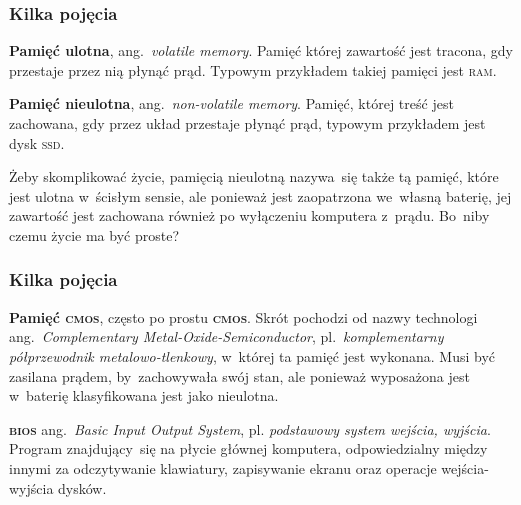 \documentclass[10pt,t]{beamer}
\begin{document}
\begin{frame}
  \frametitle{Kilka pojęcia}


  \textbf{Pamięć ulotna}, ang.~\textit{volatile memory}. Pamięć której
  zawartość jest tracona, gdy przestaje przez nią płynąć prąd. Typowym
  przykładem takiej pamięci jest \textsc{ram}.

  \textbf{Pamięć nieulotna}, ang.~\textit{non-volatile memory}. Pamięć,
  której treść jest zachowana, gdy przez układ przestaje płynąć prąd,
  typowym przykładem jest dysk \textsc{ssd}.

  Żeby skomplikować życie, pamięcią nieulotną nazywa~się także tą pamięć,
  które jest ulotna w~ścisłym sensie, ale ponieważ jest zaopatrzona
  we~własną baterię, jej zawartość jest zachowana również po wyłączeniu
  komputera z~prądu. Bo~niby czemu życie ma być proste?

\end{frame}





\begin{frame}
  \frametitle{Kilka pojęcia}


  \textbf{Pamięć \textsc{cmos}}, często po prostu \textbf{\textsc{cmos}}.
  Skrót pochodzi od nazwy technologi ang.~\textit{Complementary
    Metal-Oxide-Semiconductor}, pl.~\textit{komplementarny półprzewodnik
    metalowo-tlenkowy}, w~której ta pamięć jest wykonana. Musi być zasilana
  prądem, by~zachowywała swój stan, ale ponieważ wyposażona jest w~baterię
  klasyfikowana jest jako nieulotna.

  \textbf{\textsc{bios}} ang.~\textit{Basic Input Output System}, pl.
  \textit{podstawowy system wejścia, wyjścia}. Program znajdujący~się
  na płycie głównej komputera, odpowiedzialny między innymi za odczytywanie
  klawiatury, zapisywanie ekranu oraz operacje wejścia-wyjścia dysków.

\end{frame}
\end{document}
